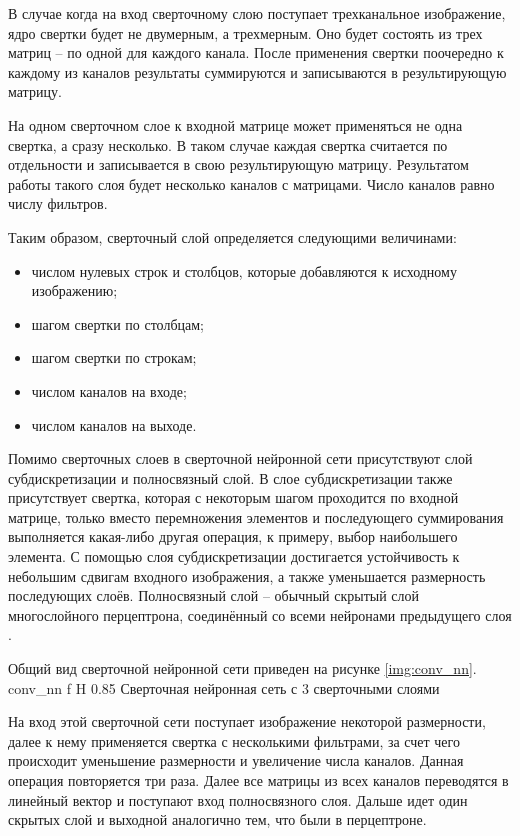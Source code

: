В случае когда на вход сверточному слою поступает трехканальное изображение, ядро свертки будет не двумерным, а трехмерным. Оно будет состоять из трех матриц -- по одной для каждого канала. После применения свертки поочередно к каждому из каналов результаты суммируются и записываются в результирующую матрицу.

На одном сверточном слое к входной матрице может применяться не одна свертка, а сразу несколько. В таком случае каждая свертка считается по отдельности и записывается в свою результирующую матрицу. Результатом работы такого слоя будет несколько каналов с матрицами. Число каналов равно числу фильтров.

Таким образом, сверточный слой определяется следующими величинами:
\begin{itemize}
	\item числом нулевых строк и столбцов, которые добавляются к исходному изображению;
	\item шагом свертки по столбцам;
	\item шагом свертки по строкам;
	\item числом каналов на входе;
	\item числом каналов на выходе.
\end{itemize}

Помимо сверточных слоев в сверточной нейронной сети присутствуют слой субдискретизации и полносвязный слой. В слое субдискретизации также присутствует свертка, которая с некоторым шагом проходится по входной матрице, только вместо перемножения элементов и последующего суммирования выполняется какая-либо другая операция, к примеру, выбор наибольшего элемента. С помощью слоя субдискретизации достигается устойчивость к небольшим сдвигам входного изображения, а также
уменьшается размерность последующих слоёв. Полносвязный слой -- обычный скрытый слой многослойного перцептрона, соединённый со всеми нейронами предыдущего слоя \cite{svertka}.

Общий вид сверточной нейронной сети приведен на рисунке \ref{img:conv_nn}.
{conv_nn} %
{f} %
{H} %
{0.85\textwidth} %
{Сверточная нейронная сеть с 3 сверточными слоями} %

На вход этой сверточной сети поступает изображение некоторой размерности, далее к нему применяется свертка с несколькими фильтрами, за счет чего происходит уменьшение размерности и увеличение числа каналов. Данная операция повторяется три раза. Далее все матрицы из всех каналов переводятся в линейный вектор и поступают вход полносвязного слоя. Дальше идет один скрытых слой и выходной аналогично тем, что были в перцептроне.

